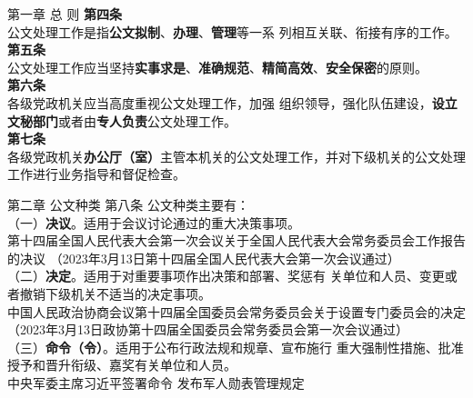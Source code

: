 \documentclass[aspectratio=169]{beamer}
\begin{document}
    \begin{frame}[t]{第一章 总 则} \vspace{20pt}
        \textbf{第四条}\\
        公文处理工作是指\textbf{公文拟制}、\textbf{办理}、\textbf{管理}等一系
        列相互关联、衔接有序的工作。\\
        \textbf{第五条}\\
        公文处理工作应当坚持\textbf{实事求是}、\textbf{准确规范}、\textbf{精简高效}、\textbf{安全保密}的原则。\\
        \textbf{第六条}\\
        各级党政机关应当高度重视公文处理工作，加强
        组织领导，强化队伍建设，\textbf{设立文秘部门}或者由\textbf{专人负责}公文处理工作。\\
        \textbf{第七条}\\
        各级党政机关\textbf{办公厅（室）}主管本机关的公文处理工作，并对下级机关的公文处理工作进行业务指导和督促检查。


    \end{frame}



    \begin{frame}[t]{第二章 公文种类} \vspace{20pt}
        第八条 公文种类主要有：\\
        （一）\textbf{决议}。适用于会议讨论通过的重大决策事项。\\
        {\scriptsize
        第十四届全国人民代表大会第一次会议关于全国人民代表大会常务委员会工作报告的决议
        （2023年3月13日第十四届全国人民代表大会第一次会议通过）
        }\\
        （二）\textbf{决定}。适用于对重要事项作出决策和部署、奖惩有
        关单位和人员、变更或者撤销下级机关不适当的决定事项。\\
        {\scriptsize
        中国人民政治协商会议第十四届全国委员会常务委员会关于设置专门委员会的决定
        （2023年3月13日政协第十四届全国委员会常务委员会第一次会议通过）
        }\\

        （三）\textbf{命令（令）}。适用于公布行政法规和规章、宣布施行
        重大强制性措施、批准授予和晋升衔级、嘉奖有关单位和人员。\\
        {\scriptsize
        中央军委主席习近平签署命令 发布军人勋表管理规定
        }

    \end{frame}
\end{document}
